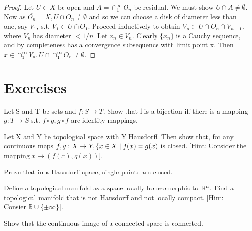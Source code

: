 \begin{proof}
Let $U\subset X$ be open and $A=\cap_1^{\infty}O_n$ be residual. We must show $U\cap A\neq\emptyset$. Now as $\overline{O_n}=X,
U\cap O_n\neq\emptyset$ and so we can choose a disk of diameter less than one, say $V_1$, s.t. $\overline{V_1}\subset U\cap O_1$.
Proceed inductively to obtain $\overline{V_n}\subset U\cap O_n\cap V_{n-1}$, where $V_n$ has diameter $<1/n$. Let $x_n\in 
\overline{V_n}$. Clearly $\{x_n\}$ is a Cauchy sequence, and by completeness has a convergence subsequence with limit point x.
Then $x\in \cap_1^{\infty}\overline{V_n}, U\cap \cap_1^{\infty}O_n\neq\emptyset$.
\end{proof}
\section*{Exercises}
\begin{exer}
Let S and T be sets and $f:S\rightarrow T$. Show that f is a bijection iff there is a mapping $g:T\rightarrow S$ s.t. $f\circ g,
g\circ f$ are identity mappings.
\end{exer}
\begin{exer}
Let X and Y be topological space with Y Hausdorff. Then show that, for any continuous maps ${f,g}:{X}\rightarrow{Y},\lbrace x\in X\mid
f(x)=g(x)$ is closed. [Hint: Consider the mapping $x\longmapsto (f(x),g(x))$].
\end{exer}
\begin{exer}
Prove that in a Hausdorff space, single points are closed.
\end{exer}
\begin{exer}
Define a topological manifold as a space locally homeomorphic to $\mathbb{R}^{n}$. Find a topological manifold that is not Hausdorff and 
not locally compact. [Hint: Consier $\mathbb{R}\cup\{\pm\infty\}$].
\end{exer}
\begin{exer}
Show that the continuous image of a connected space is connected.
\end{exer}
